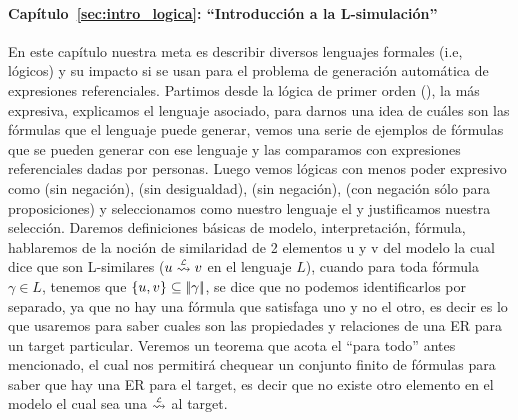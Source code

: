 \paragraph{Cap\'itulo~\ref{sec:intro_logica}: ``Introducci\'on a la L-simulaci\'on''} En este cap\'itulo nuestra meta es describir diversos lenguajes formales (i.e, l\'ogicos) y su impacto si se usan para el problema de generaci\'on autom\'atica de expresiones referenciales.  Partimos desde la l\'ogica de primer orden (\FOL), la m\'as expresiva, explicamos el lenguaje asociado, para darnos una idea de cu\'ales son las f\'ormulas que el lenguaje puede generar, vemos una serie de ejemplos de f\'ormulas que se pueden generar con ese lenguaje y las comparamos con expresiones referenciales dadas por personas. Luego vemos l\'ogicas con menos poder expresivo como \EPFOL (\FOL sin negaci\'on), \ALC (\FOL sin desigualdad), \EL(\ALC sin negaci\'on), \ELAN (\ALC con negaci\'on s\'olo para proposiciones) y seleccionamos como nuestro lenguaje el \EL y justificamos nuestra selecci\'on. Daremos definiciones b\'asicas de modelo, interpretaci\'on, f\'ormula, hablaremos de la noci\'on de similaridad de 2 elementos u y v del modelo la cual dice que son L-similares ($u \simil{\+L} v$ en el lenguaje $L$), cuando para toda f\'ormula $\gamma \in L$, tenemos que $\{u,v\} \subseteq |\!|\gamma|\!|$, se dice que no podemos identificarlos por separado, ya que no hay una f\'ormula que satisfaga uno y no el otro, es decir es lo que usaremos para saber cuales son las propiedades y relaciones de una ER para un target particular. Veremos un teorema que acota el ``para todo'' antes mencionado, el cual nos permitir\'a chequear un conjunto finito de f\'ormulas para saber que hay una ER para el target, es decir que no existe otro elemento en el modelo el cual sea una $\simil{\+L}$ al target. 
%

